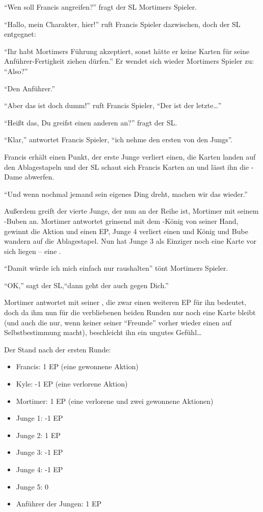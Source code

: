 "`Wen soll Francis angreifen?"' fragt der SL Mortimers Spieler.

"`Hallo, mein Charakter, hier!"' ruft Francis Spieler dazwischen, doch der SL entgegnet:

"`Ihr habt Mortimers Führung akzeptiert, sonst hätte er keine Karten für seine Anführer-Fertigkeit ziehen dürfen."' Er wendet sich wieder Mortimers Spieler zu: "`Also?"'

"`Den Anführer."'

"`Aber das ist doch dumm!"' ruft Francis Spieler, "`Der ist der letzte\dots"' 

"`Heißt das, Du greifst einen anderen an?"' fragt der SL.

"`Klar,"' antwortet Francis Spieler, "`ich nehme den ersten von den Jungs"'.

Francis erhält einen Punkt, der erste Junge verliert einen, die Karten landen auf den Ablagestapeln und der SL schaut sich Francis Karten an und lässt ihn die \kreuz-Dame abwerfen.

"`Und wenn nochmal jemand sein eigenes Ding dreht, machen wir das wieder."'

Außerdem greift der vierte Junge, der nun an der Reihe ist, Mortimer mit seinem \pik-Buben an.
Mortimer antwortet grinsend mit dem \herz-König von seiner Hand, gewinnt die Aktion und einen EP, Junge 4 verliert einen und König und Bube wandern auf die Ablagestapel.
Nun hat Junge 3 als Einziger noch eine Karte vor sich liegen -- eine .

"`Damit würde ich mich einfach nur raushalten"' tönt Mortimers Spieler.

"`OK,"' sagt der SL,"`dann geht der auch gegen Dich."'

Mortimer antwortet mit seiner , die zwar einen weiteren EP für ihn bedeutet, doch da ihm nun für die verbliebenen beiden Runden nur noch eine Karte bleibt (und auch die nur, wenn keiner seiner "`Freunde"' vorher wieder einen auf Selbstbestimmung macht), beschleicht ihn ein ungutes Gefühl\dots

Der Stand nach der ersten Runde:
\begin {itemize}
\item Francis: 1 EP (eine gewonnene Aktion)
\item Kyle: -1 EP (eine verlorene Aktion)
\item Mortimer: 1 EP (eine verlorene und zwei gewonnene Aktionen)
\item Junge 1: -1 EP
\item Junge 2: 1 EP
\item Junge 3: -1 EP
\item Junge 4: -1 EP
\item Junge 5: 0
\item Anführer der Jungen: 1 EP
\end {itemize}


